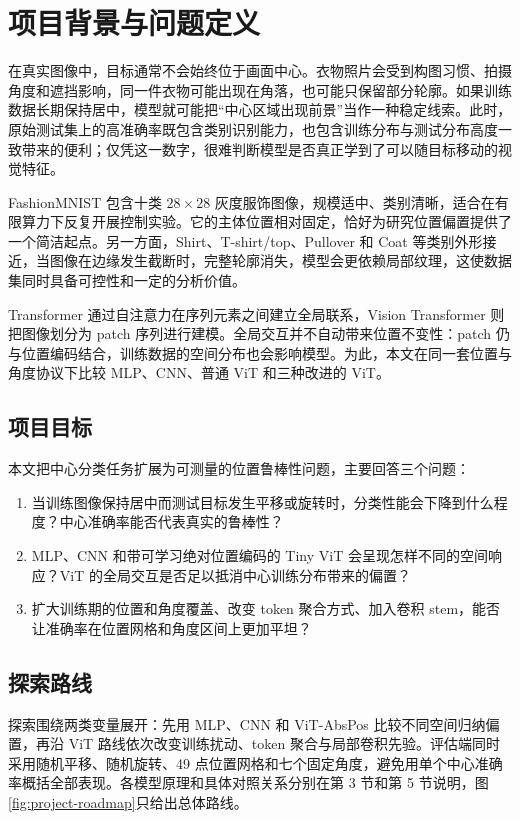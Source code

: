 \section{项目背景与问题定义}

在真实图像中，目标通常不会始终位于画面中心。衣物照片会受到构图习惯、拍摄角度和遮挡影响，同一件衣物可能出现在角落，也可能只保留部分轮廓。如果训练数据长期保持居中，模型就可能把“中心区域出现前景”当作一种稳定线索。此时，原始测试集上的高准确率既包含类别识别能力，也包含训练分布与测试分布高度一致带来的便利；仅凭这一数字，很难判断模型是否真正学到了可以随目标移动的视觉特征。

FashionMNIST 包含十类 $28\times28$ 灰度服饰图像\cite{xiao2017fashion}，规模适中、类别清晰，适合在有限算力下反复开展控制实验。它的主体位置相对固定，恰好为研究位置偏置提供了一个简洁起点。另一方面，Shirt、T-shirt/top、Pullover 和 Coat 等类别外形接近，当图像在边缘发生截断时，完整轮廓消失，模型会更依赖局部纹理，这使数据集同时具备可控性和一定的分析价值。

Transformer 通过自注意力在序列元素之间建立全局联系\cite{vaswani2017attention}，Vision Transformer 则把图像划分为 patch 序列进行建模\cite{dosovitskiy2021image}。全局交互并不自动带来位置不变性：patch 仍与位置编码结合，训练数据的空间分布也会影响模型。为此，本文在同一套位置与角度协议下比较 MLP、CNN、普通 ViT 和三种改进的 ViT。

\subsection{项目目标}

本文把中心分类任务扩展为可测量的位置鲁棒性问题，主要回答三个问题：

\begin{enumerate}
  \item 当训练图像保持居中而测试目标发生平移或旋转时，分类性能会下降到什么程度？中心准确率能否代表真实的鲁棒性？
  \item MLP、CNN 和带可学习绝对位置编码的 Tiny ViT 会呈现怎样不同的空间响应？ViT 的全局交互是否足以抵消中心训练分布带来的偏置？
  \item 扩大训练期的位置和角度覆盖、改变 token 聚合方式、加入卷积 stem，能否让准确率在位置网格和角度区间上更加平坦？
\end{enumerate}

\subsection{探索路线}

探索围绕两类变量展开：先用 MLP、CNN 和 ViT-AbsPos 比较不同空间归纳偏置，再沿 ViT 路线依次改变训练扰动、token 聚合与局部卷积先验。评估端同时采用随机平移、随机旋转、49 点位置网格和七个固定角度，避免用单个中心准确率概括全部表现。各模型原理和具体对照关系分别在第 3 节和第 5 节说明，图\ref{fig:project-roadmap}只给出总体路线。


